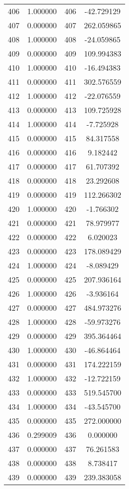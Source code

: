 \documentclass[12pt]{article}
\begin{document}
\begin{longtable}{@{}cccc@{}}
406 & 1.000000 & 406 & -42.729129 \\
407 & 0.000000 & 407 & 262.059865 \\
408 & 1.000000 & 408 & -24.059865 \\
409 & 0.000000 & 409 & 109.994383 \\
410 & 1.000000 & 410 & -16.494383 \\
411 & 0.000000 & 411 & 302.576559 \\
412 & 1.000000 & 412 & -22.076559 \\
413 & 0.000000 & 413 & 109.725928 \\
414 & 1.000000 & 414 & -7.725928 \\
415 & 0.000000 & 415 & 84.317558 \\
416 & 0.000000 & 416 & 9.182442 \\
417 & 0.000000 & 417 & 61.707392 \\
418 & 0.000000 & 418 & 23.292608 \\
419 & 0.000000 & 419 & 112.266302 \\
420 & 1.000000 & 420 & -1.766302 \\
421 & 0.000000 & 421 & 78.979977 \\
422 & 0.000000 & 422 & 6.020023 \\
423 & 0.000000 & 423 & 178.089429 \\
424 & 1.000000 & 424 & -8.089429 \\
425 & 0.000000 & 425 & 207.936164 \\
426 & 1.000000 & 426 & -3.936164 \\
427 & 0.000000 & 427 & 484.973276 \\
428 & 1.000000 & 428 & -59.973276 \\
429 & 0.000000 & 429 & 395.364464 \\
430 & 1.000000 & 430 & -46.864464 \\
431 & 0.000000 & 431 & 174.222159 \\
432 & 1.000000 & 432 & -12.722159 \\
433 & 0.000000 & 433 & 519.545700 \\
434 & 1.000000 & 434 & -43.545700 \\
435 & 0.000000 & 435 & 272.000000 \\
436 & 0.299009 & 436 & 0.000000 \\
437 & 0.000000 & 437 & 76.261583 \\
438 & 0.000000 & 438 & 8.738417 \\
439 & 0.000000 & 439 & 239.383058 \\

\end{longtable}
\end{document}
